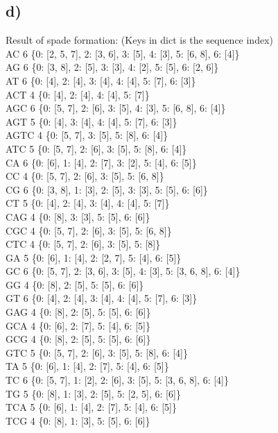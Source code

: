 \documentclass[a4paper,11pt,oneside]{article}
\begin{document}
\subsection*{d)}
Result of spade formation: (Keys in dict is the sequence index) \\
AC 6 \{0: [2, 5, 7], 2: [3, 6], 3: [5], 4: [3], 5: [6, 8], 6: [4]\} \\
AG 6 \{0: [3, 8], 2: [5], 3: [3], 4: [2], 5: [5], 6: [2, 6]\} \\
AT 6 \{0: [4], 2: [4], 3: [4], 4: [4], 5: [7], 6: [3]\} \\
ACT 4 \{0: [4], 2: [4], 4: [4], 5: [7]\} \\
AGC 6 \{0: [5, 7], 2: [6], 3: [5], 4: [3], 5: [6, 8], 6: [4]\} \\
AGT 5 \{0: [4], 3: [4], 4: [4], 5: [7], 6: [3]\} \\
AGTC 4 \{0: [5, 7], 3: [5], 5: [8], 6: [4]\} \\
ATC 5 \{0: [5, 7], 2: [6], 3: [5], 5: [8], 6: [4]\} \\
CA 6 \{0: [6], 1: [4], 2: [7], 3: [2], 5: [4], 6: [5]\} \\
CC 4 \{0: [5, 7], 2: [6], 3: [5], 5: [6, 8]\} \\
CG 6 \{0: [3, 8], 1: [3], 2: [5], 3: [3], 5: [5], 6: [6]\} \\
CT 5 \{0: [4], 2: [4], 3: [4], 4: [4], 5: [7]\} \\
CAG 4 \{0: [8], 3: [3], 5: [5], 6: [6]\} \\
CGC 4 \{0: [5, 7], 2: [6], 3: [5], 5: [6, 8]\} \\
CTC 4 \{0: [5, 7], 2: [6], 3: [5], 5: [8]\} \\
GA 5 \{0: [6], 1: [4], 2: [2, 7], 5: [4], 6: [5]\} \\
GC 6 \{0: [5, 7], 2: [3, 6], 3: [5], 4: [3], 5: [3, 6, 8], 6: [4]\} \\
GG 4 \{0: [8], 2: [5], 5: [5], 6: [6]\} \\
GT 6 \{0: [4], 2: [4], 3: [4], 4: [4], 5: [7], 6: [3]\} \\
GAG 4 \{0: [8], 2: [5], 5: [5], 6: [6]\} \\
GCA 4 \{0: [6], 2: [7], 5: [4], 6: [5]\} \\
GCG 4 \{0: [8], 2: [5], 5: [5], 6: [6]\} \\
GTC 5 \{0: [5, 7], 2: [6], 3: [5], 5: [8], 6: [4]\} \\
TA 5 \{0: [6], 1: [4], 2: [7], 5: [4], 6: [5]\} \\
TC 6 \{0: [5, 7], 1: [2], 2: [6], 3: [5], 5: [3, 6, 8], 6: [4]\} \\
TG 5 \{0: [8], 1: [3], 2: [5], 5: [2, 5], 6: [6]\} \\
TCA 5 \{0: [6], 1: [4], 2: [7], 5: [4], 6: [5]\} \\
TCG 4 \{0: [8], 1: [3], 5: [5], 6: [6]\} \\
\end{document}
